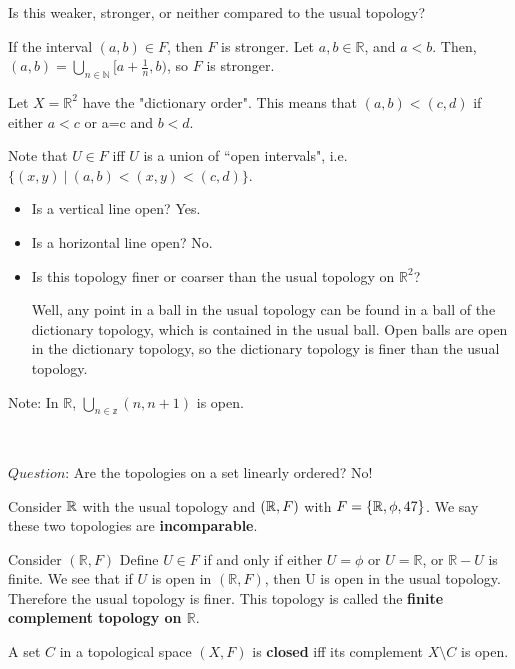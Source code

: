 Is this weaker, stronger, or neither compared to the usual topology?

If the interval $(a,b) \in F$, then $F$ is stronger. Let $a,b \in \mathbb{R}$, and $a<b$. Then, $(a,b)=\bigcup_{n\in \mathbb{N}}[a+\frac{1}{n},b)$, so $F$ is stronger.
\begin{example}
	Let $X=\mathbb{R}^{2}$ have the "dictionary order". This means that $(a,b)<(c,d)$ if either $a<c$ or a=c and $b<d$. 
\end{example}

Note that $U\in F$ iff $U$ is a union of ``open intervals", i.e. $\{(x,y)\ |\ (a,b)<(x,y)<(c,d)\}$.
\begin{itemize}
	\item Is a vertical line open? Yes. 
	\item Is a horizontal line open? No. 
	\item Is this topology finer or coarser than the usual topology on $\mathbb{R}^{2}$?
	
	Well, any point in a ball in the usual topology can be found in a ball of the dictionary topology, which is contained in the usual ball. Open balls are open in the dictionary topology, so the dictionary topology is finer than the usual topology. 
\end{itemize}

Note: In $\mathbb{R}$, $\bigcup_{n\in \mathbb{z}}(n,n+1)$ is open.

\mbox{ }

$Question$: Are the topologies on a set linearly ordered? No! 
\begin{example}
	Consider $\mathbb R$ with the usual topology and $(\mathbb R, F)$ with $F = \left\{ \mathbb R, \phi,47 \right\}$. We say these two topologies are {\bf incomparable}. 
\end{example}
\begin{example}
	Consider $(\mathbb{R},F)$ Define $U \in F$ if and only if either $U=\phi$ or $U=\mathbb{R}$, or $\mathbb{R}-U$ is finite. We see that if $U$ is open in $(\mathbb{R},F)$, then U is open in the usual topology. Therefore the usual topology is finer. This topology is called the {\bf finite complement topology on $\mathbb{R}$}. 
\end{example}
\begin{definition}
	A set $C$ in a topological space $(X,F)$ is {\bf closed} iff its complement $X\setminus C$ is open. 
\end{definition}

